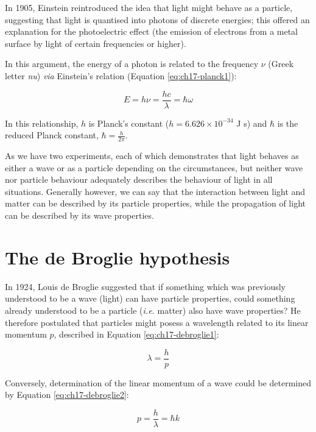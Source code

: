 \documentclass[
]{book}
\begin{document}
In 1905, Einstein reintroduced the idea that light might behave as a particle, suggesting that light is quantised into photons of discrete energies; this offered an explanation for the photoelectric effect (the emission of electrons from a metal surface by light of certain frequencies or higher).

In this argument, the energy of a photon is related to the frequency \(\nu\) (Greek letter \emph{nu}) \emph{via} Einstein's relation (Equation \eqref{eq:ch17-planck1}):

\begin{equation}
E = h \nu = \frac{hc}{\lambda} = \hbar \omega
\label{eq:ch17-planck1}
\end{equation}

In this relationship, \(h\) is Planck's constant (\(h = 6.626 \times 10^{-34}\) J s) and \(\hbar\) is the reduced Planck constant, \(\hbar = \frac{h}{2\pi}\).

As we have two experiments, each of which demonstrates that light behaves as either a wave or as a particle depending on the circumstances, but neither wave nor particle behaviour adequately describes the behaviour of light in all situations. Generally however, we can say that the interaction between light and matter can be described by its particle properties, while the propagation of light can be described by its wave properties.

\hypertarget{sec:ch17-debrogliehyp1}{%
\section{The de Broglie hypothesis}\label{sec:ch17-debrogliehyp1}}

In 1924, Louis de Broglie suggested that if something which was previously understood to be a wave (light) can have particle properties, could something already understood to be a particle (\emph{i.e.} matter) also have wave properties? He therefore postulated that particles might posess a wavelength related to its linear momentum \(p\), described in Equation \eqref{eq:ch17-debroglie1}:

\begin{equation}
\lambda = \frac{h}{p}
\label{eq:ch17-debroglie1}
\end{equation}

Conversely, determination of the linear momentum of a wave could be determined by Equation \eqref{eq:ch17-debroglie2}:

\begin{equation}
p = \frac{h}{\lambda} = \hbar k
\label{eq:ch17-debroglie2}
\end{equation}
\end{document}
